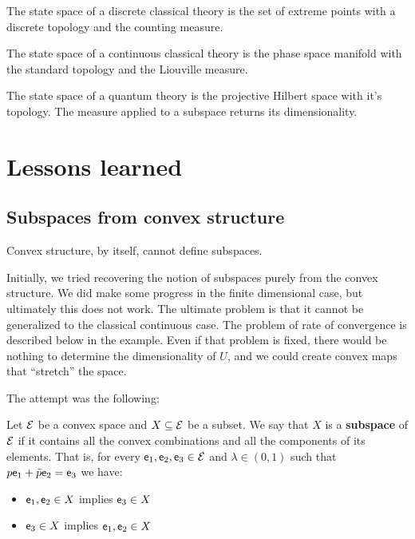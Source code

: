\begin{conj}
	The state space of a discrete classical theory is the set of extreme points with a discrete topology and the counting measure.
\end{conj}

\begin{conj}
	The state space of a continuous classical theory is the phase space manifold with the standard topology and the Liouville measure.
\end{conj}

\begin{conj}
	The state space of a quantum theory is the projective Hilbert space with it's topology. The measure applied to a subspace returns its dimensionality.
\end{conj}




\section{Lessons learned}

\subsection{Subspaces from convex structure}

\begin{insight}
	Convex structure, by itself, cannot define subspaces.
\end{insight}

Initially, we tried recovering the notion of subspaces purely from the convex structure. We did make some progress in the finite dimensional case, but ultimately this does not work. The ultimate problem is that it cannot be generalized to the classical continuous case. The problem of rate of convergence is described below in the example. Even if that problem is fixed, there would be nothing to determine the dimensionality of $U$, and we could create convex maps that ``stretch'' the space.

The attempt was the following:

\begin{defn}
	Let $\mathcal{E}$ be a convex space and $X \subseteq \mathcal{E}$ be a subset. We say that $X$ is a \textbf{subspace} of $\mathcal{E}$ if it contains all the convex combinations and all the components of its elements. That is, for every $\mathsf{e}_1, \mathsf{e}_2, \mathsf{e}_3 \in \mathcal{E}$ and $\lambda \in (0,1)$ such that $p \mathsf{e}_1 + \bar{p} \mathsf{e}_2 = \mathsf{e}_3$ we have:
	\begin{itemize}
		\item $\mathsf{e}_1, \mathsf{e}_2 \in X$ implies $\mathsf{e}_3 \in X$
		\item $\mathsf{e}_3 \in X$ implies $\mathsf{e}_1, \mathsf{e}_2 \in X$
	\end{itemize}
\end{defn}

